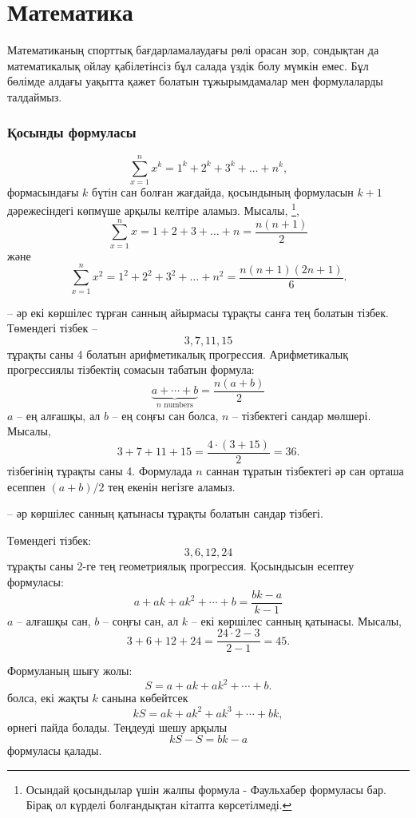 \section{Математика}

Математиканың спорттық бағдарламалаудағы рөлі орасан зор,
сондықтан да математикалық ойлау қабілетінсіз бұл салада үздік болу мүмкін емес.
Бұл бөлімде алдағы уақытта қажет болатын тұжырымдамалар мен формулаларды талдаймыз.

\subsubsection{Қосынды формуласы}

\[\sum_{x=1}^n x^k = 1^k+2^k+3^k+\ldots+n^k,\]
формасындағы $k$ бүтін сан болған жағдайда,
қосындының формуласын $k+1$ дәрежесіндегі 
көпмүше арқылы келтіре аламыз.
Мысалы, \footnote{
Осындай қосындылар үшін жалпы формула - Фаульхабер формуласы бар.
Бірақ ол күрделі болғандықтан кітапта көрсетілмеді.},
\[\sum_{x=1}^n x = 1+2+3+\ldots+n = \frac{n(n+1)}{2}\]
және
\[\sum_{x=1}^n x^2 = 1^2+2^2+3^2+\ldots+n^2 = \frac{n(n+1)(2n+1)}{6}.\]

 -- 
әр екі көршілес тұрған санның айырмасы тұрақты санға тең болатын тізбек.
Төмендегі тізбек --
\[3, 7, 11, 15\]
тұрақты саны 4 болатын арифметикалық прогрессия.
Арифметикалық прогрессиялы тізбектің сомасын табатын формула:
\[\underbrace{a + \cdots + b}_{n \,\, \textrm{numbers}} = \frac{n(a+b)}{2}\]
$a$ -- ең алғашқы,
ал $b$ -- ең соңғы сан болса,
$n$ -- тізбектегі сандар мөлшері.
Мысалы,
\[3+7+11+15=\frac{4 \cdot (3+15)}{2} = 36.\]
тізбегінің тұрақты саны 4.
Формулада $n$ саннан тұратын тізбектегі әр сан орташа 
есеппен $(a+b)/2$ тең екенін негізге аламыз.

 -- әр көршілес санның қатынасы тұрақты болатын сандар тізбегі.

Төмендегі тізбек:
\[3,6,12,24\]
тұрақты саны 2-ге тең геометриялық прогрессия.
Қосындысын есептеу формуласы:
\[a + ak + ak^2 + \cdots + b = \frac{bk-a}{k-1}\]
$a$ -- алғашқы сан,
$b$ -- соңғы сан, ал $k$ -- екі көршілес санның қатынасы.
Мысалы,
\[3+6+12+24=\frac{24 \cdot 2 - 3}{2-1} = 45.\]

Формуланың шығу жолы:
\[ S = a + ak + ak^2 + \cdots + b .\] болса,
екі жақты $k$ санына көбейтсек
\[ kS = ak + ak^2 + ak^3 + \cdots + bk,\] өрнегі пайда болады.
Теңдеуді шешу арқылы
\[ kS-S = bk-a\]
формуласы қалады.

